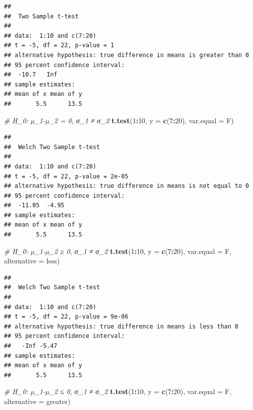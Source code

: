 \documentclass[
]{book}
\newenvironment{Shaded}{\begin{snugshade}}{\end{snugshade}}
\newcommand{\CommentTok}[1]{\textcolor[rgb]{0.56,0.35,0.01}{\textit{#1}}}
\newcommand{\DataTypeTok}[1]{\textcolor[rgb]{0.13,0.29,0.53}{#1}}
\newcommand{\DecValTok}[1]{\textcolor[rgb]{0.00,0.00,0.81}{#1}}
\newcommand{\KeywordTok}[1]{\textcolor[rgb]{0.13,0.29,0.53}{\textbf{#1}}}
\newcommand{\NormalTok}[1]{#1}
\newcommand{\OperatorTok}[1]{\textcolor[rgb]{0.81,0.36,0.00}{\textbf{#1}}}
\newcommand{\StringTok}[1]{\textcolor[rgb]{0.31,0.60,0.02}{#1}}
\theoremstyle{definition}
\theoremstyle{definition}
\theoremstyle{definition}
\theoremstyle{remark}
\begin{document}
\begin{verbatim}
## 
##  Two Sample t-test
## 
## data:  1:10 and c(7:20)
## t = -5, df = 22, p-value = 1
## alternative hypothesis: true difference in means is greater than 0
## 95 percent confidence interval:
##  -10.7   Inf
## sample estimates:
## mean of x mean of y 
##       5.5      13.5
\end{verbatim}

\begin{Shaded}
\begin{Highlighting}[]
\CommentTok{\# H\_0: µ\_1{-}µ\_2 = 0, σ\_1 ≠ σ\_2}
\KeywordTok{t.test}\NormalTok{(}\DecValTok{1}\OperatorTok{:}\DecValTok{10}\NormalTok{, }\DataTypeTok{y =} \KeywordTok{c}\NormalTok{(}\DecValTok{7}\OperatorTok{:}\DecValTok{20}\NormalTok{), }\DataTypeTok{var.equal =}\NormalTok{ F)                          }
\end{Highlighting}
\end{Shaded}

\begin{verbatim}
## 
##  Welch Two Sample t-test
## 
## data:  1:10 and c(7:20)
## t = -5, df = 22, p-value = 2e-05
## alternative hypothesis: true difference in means is not equal to 0
## 95 percent confidence interval:
##  -11.05  -4.95
## sample estimates:
## mean of x mean of y 
##       5.5      13.5
\end{verbatim}

\begin{Shaded}
\begin{Highlighting}[]
\CommentTok{\# H\_0: µ\_1{-}µ\_2 ≥ 0, σ\_1 ≠ σ\_2  }
\KeywordTok{t.test}\NormalTok{(}\DecValTok{1}\OperatorTok{:}\DecValTok{10}\NormalTok{, }\DataTypeTok{y =} \KeywordTok{c}\NormalTok{(}\DecValTok{7}\OperatorTok{:}\DecValTok{20}\NormalTok{), }\DataTypeTok{var.equal =}\NormalTok{ F, }\DataTypeTok{alternative =} \StringTok{\textquotesingle{}less\textquotesingle{}}\NormalTok{)    }
\end{Highlighting}
\end{Shaded}

\begin{verbatim}
## 
##  Welch Two Sample t-test
## 
## data:  1:10 and c(7:20)
## t = -5, df = 22, p-value = 9e-06
## alternative hypothesis: true difference in means is less than 0
## 95 percent confidence interval:
##   -Inf -5.47
## sample estimates:
## mean of x mean of y 
##       5.5      13.5
\end{verbatim}

\begin{Shaded}
\begin{Highlighting}[]
\CommentTok{\# H\_0: µ\_1{-}µ\_2 ≤ 0, σ\_1 ≠ σ\_2}
\KeywordTok{t.test}\NormalTok{(}\DecValTok{1}\OperatorTok{:}\DecValTok{10}\NormalTok{, }\DataTypeTok{y =} \KeywordTok{c}\NormalTok{(}\DecValTok{7}\OperatorTok{:}\DecValTok{20}\NormalTok{), }\DataTypeTok{var.equal =}\NormalTok{ F, }\DataTypeTok{alternative =} \StringTok{\textquotesingle{}greater\textquotesingle{}}\NormalTok{) }
\end{Highlighting}
\end{Shaded}
\end{document}
